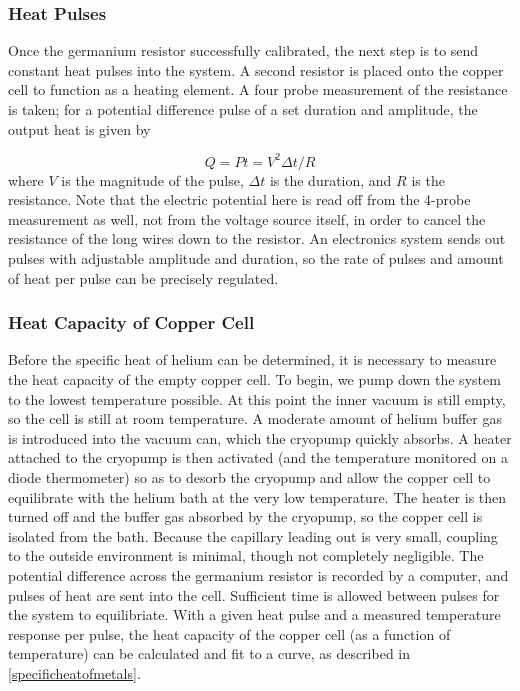\subsubsection{Heat Pulses}

Once the germanium resistor successfully calibrated, the next step is
to send constant heat pulses into the system. A second resistor is
placed onto the copper cell to function as a heating element. A four
probe measurement of the resistance is taken; for a potential
difference pulse of a set duration and amplitude, the output heat is given by

\begin{equation}
Q = P t = V^{2} \Delta t /R
\end{equation}
where $V$ is the magnitude of the pulse, $\Delta t$ is the duration,
and $R$ is the resistance. Note that the electric potential here is
read off from the 4-probe measurement as well, not from the voltage
source itself, in order to cancel the resistance of the long wires
down to the resistor. An electronics system sends out pulses with
adjustable amplitude and duration, so the rate of pulses and amount of
heat per pulse can be precisely regulated.


\subsubsection{Heat Capacity of Copper Cell}

Before the specific heat of helium can be determined, it is necessary
to measure the heat capacity of the empty copper cell. To begin, we
pump down the system to the lowest temperature possible. At this point
the inner vacuum is still empty, so the cell is still at room
temperature. A moderate amount of helium buffer gas is introduced into
the vacuum can, which the cryopump quickly absorbs. A heater attached
to the cryopump is then activated (and the temperature monitored on a
diode thermometer) so as to desorb the cryopump and allow the copper
cell to equilibrate with the helium bath at the very low
temperature. The heater is then turned off and the buffer gas absorbed
by the cryopump, so the copper cell is isolated from the bath. Because
the capillary leading out is very small, coupling to the outside
environment is minimal, though not completely negligible. The potential
difference across the germanium resistor is recorded by a computer,
and pulses of heat are sent into the cell. Sufficient time is allowed
between pulses for the system to equilibriate. With a given heat pulse
and a measured temperature response per pulse, the heat capacity of
the copper cell (as a function of temperature) can be calculated and
fit to a curve, as described in \ref{specificheatofmetals}.

